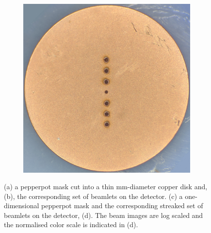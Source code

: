 \begin{figure}
    \begin{subfigure}{0.49\linewidth}
    \centering
    \includegraphics[width=\linewidth]{part2/Figs/example_pepperpot_1d.jpg}
    \caption{}
    \label{figure:1d_pepperpot}
    \end{subfigure}
    \begin{subfigure}{0.49\linewidth}
    \centering
    
    \caption{}
    \label{figure:streaked_1d_pepperpot}
    \end{subfigure}
    \caption[One- and two-dimensional pepperpot masks.]{(a) a pepperpot mask cut into a thin \unit[3]{mm}-diameter copper disk and, (b), the corresponding set of beamlets on the detector. (c) a one-dimensional pepperpot mask and the corresponding streaked set of beamlets on the detector, (d). The beam images are log scaled and the normalised color scale is indicated in (d).}
    \label{figure:pepperpot_example}
\end{figure}

